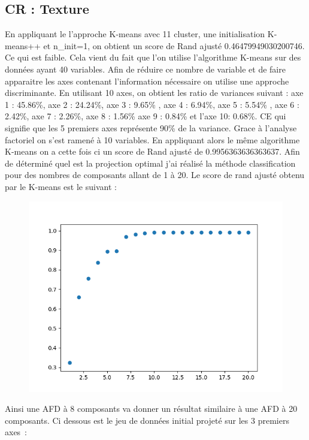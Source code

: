 \documentclass[12pt]{scrartcl} %
\begin{document}
\subsection{CR : Texture}
En appliquant le l'approche K-means avec 11 cluster, une initialisation K-means++ et n\_init=1, on obtient un score de Rand ajusté 0.46479949030200746. Ce qui est faible. Cela vient du fait que l'on utilise l'algorithme K-means sur des données ayant 40 variables. Afin de réduire ce nombre de variable et de faire apparaitre les axes contenant l'information nécessaire on utilise une approche discriminante. En utilisant 10 axes, on obtient les ratio de variances suivant : axe 1 : 45.86\%, axe 2 : 24.24\%, axe 3 : 9.65\% , axe 4 : 6.94\%, axe 5 :  5.54\% , axe 6 : 2.42\%, axe 7 :
 2.26\%, axe 8 : 1.56\% axe 9 : 0.84\% et l'axe 10: 0.68\%. CE qui signifie que les 5 premiers axes représente 90\% de la variance. Grace à l'analyse factoriel on s'est ramené à 10 variables. En appliquant alors le même algorithme K-means on a cette fois ci un score de Rand ajusté de 0.9956363636363637. Afin de déterminé quel est la projection optimal j'ai réalisé la méthode classification pour des nombres de composants allant de 1 à 20. Le score de rand ajusté obtenu par le K-means est le suivant : 
\newline
\begin{figure}[!h]
 \centering 
\includegraphics[scale=.3]{AFD_K_means.png}
\end{figure}
\newline 
Ainsi une AFD à 8 composants va donner un résultat similaire à une AFD à 20 composants. Ci dessous est le jeu de données initial projeté sur les 3 premiers axes~: 
\end{document}
